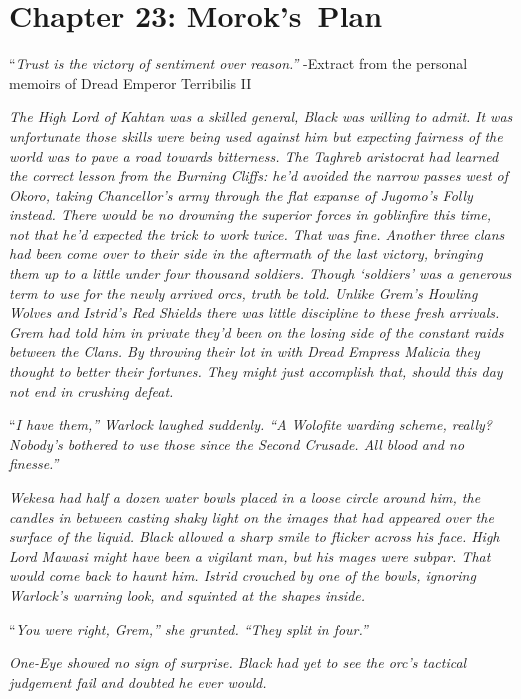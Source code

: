 \documentclass[12pt, openany]{book}
\begin{document}
\chapter{Chapter 23: Morok’s Plan}

“\textit{Trust is the victory of sentiment over reason.”}
-Extract from the personal memoirs of Dread Emperor Terribilis II

\textit{The High Lord of Kahtan was a skilled general, Black was willing to admit.}
\textit{It was unfortunate those skills were being used against him but expecting fairness of the world was to pave a road towards bitterness. The Taghreb aristocrat had learned the correct lesson from the Burning Cliffs: he’d avoided the narrow passes west of Okoro, taking Chancellor’s army through the flat expanse of Jugomo’s Folly instead. There would be no drowning the superior forces in goblinfire this time, not that he’d expected the trick to work twice. That was fine. Another three clans had been come over to their side in the aftermath of the last victory, bringing them up to a little under four thousand soldiers. Though ‘soldiers’ was a generous term to use for the newly arrived orcs, truth be told. Unlike Grem’s Howling Wolves and Istrid’s Red Shields there was little discipline to these fresh arrivals. Grem had told him in private they’d been on the losing side of the constant raids between the Clans. By throwing their lot in with Dread Empress Malicia they thought to better their fortunes. They might just accomplish that, should this day not end in crushing defeat.}

“\textit{I have them,” Warlock laughed suddenly. “A Wolofite warding scheme, really? Nobody’s bothered to use those since the Second Crusade. All blood and no finesse.”}

\textit{Wekesa had half a dozen water bowls placed in a loose circle around him, the candles in between casting shaky light on the images that had appeared over the surface of the liquid. Black allowed a sharp smile to flicker across his face. High Lord Mawasi might have been a vigilant man, but his mages were subpar. That would come back to haunt him. Istrid crouched by one of the bowls, ignoring Warlock’s warning look, and squinted at the shapes inside.}

“\textit{You were right, Grem,” she grunted. “They split in four.”}

\textit{One-Eye showed no sign of surprise. Black had yet to see the orc’s tactical judgement fail and doubted he ever would.}
\end{document}

